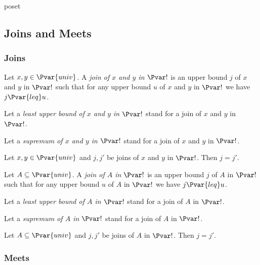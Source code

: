 \documentclass{stex}
\begin{document}
\begin{smodule}{poset}
  \subsection{Joins and Meets}

  \subsubsection{Joins}

  \begin{forthel}
    \begin{definition*}
      Let $x, y \in \Pvar{univ}$.
      A \emph{join of $x$ and $y$ in $\Pvar!$} is an upper bound $j$ of $x$ and $y$ in $\Pvar!$ such that for any upper bound $u$ of $x$ and $y$ in $\Pvar!$ we have $j {\Pvar{leq}} u$.
    \end{definition*}

    Let a \emph{least upper bound of $x$ and $y$ in $\Pvar!$} stand for a join of $x$ and $y$ in $\Pvar!$.

    Let a \emph{supremum of $x$ and $y$ in $\Pvar!$} stand for a join of $x$ and $y$ in $\Pvar!$.

    \begin{proposition*}
      Let $x, y \in \Pvar{univ}$ and $j, j'$ be joins of $x$ and $y$ in $\Pvar!$.
      Then $j = j'$.
    \end{proposition*}
    
    \begin{definition*}
      Let $A \subseteq \Pvar{univ}$.
      A \emph{join of $A$ in $\Pvar!$} is an upper bound $j$ of $A$ in $\Pvar!$ such that for any upper bound $u$ of $A$ in $\Pvar!$ we have $j {\Pvar{leq}} u$.
    \end{definition*}

    Let a \emph{least upper bound of $A$ in $\Pvar!$} stand for a join of $A$ in $\Pvar!$.

    Let a \emph{supremum of $A$ in $\Pvar!$} stand for a join of $A$ in $\Pvar!$.

    \begin{proposition*}
      Let $A \subseteq \Pvar{univ}$ and $j, j'$ be joins of $A$ in $\Pvar!$.
      Then $j = j'$.
    \end{proposition*}
  \end{forthel}

  \subsubsection{Meets}


\end{smodule}
\end{document}
